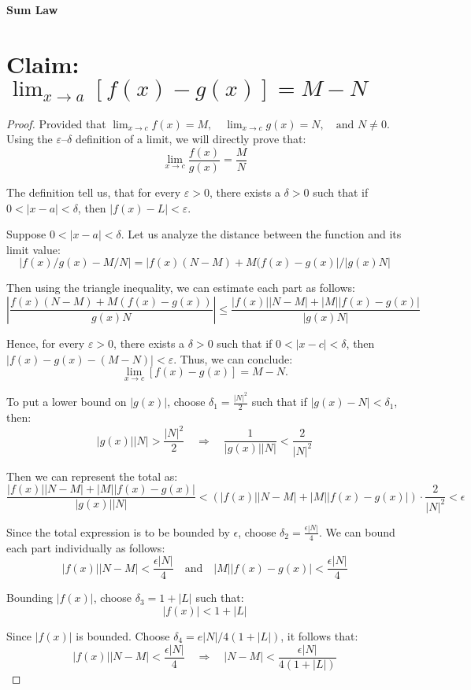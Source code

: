 \documentclass{article}
\begin{document}
\textbf{Sum Law}

\section*{Claim: $\lim_{x \to a} [f(x) - g(x)] = M - N$}


\begin{proof}

Provided that $\lim_{x \to c} f(x) = M, \quad \lim_{x \to c} g(x) = N, \quad \text{and } N \neq 0.$ Using the $\varepsilon$–$\delta$ definition of a limit, we will directly prove that:
\[
\lim_{x \to c} \frac{f(x)}{g(x)} = \frac{M}{N}
\]


The definition tell us, that for every $\varepsilon > 0$, there exists a $\delta > 0$ such that if $0 < |x - a| < \delta$, then $|f(x) - L| < \varepsilon$.

Suppose $0 < |x - a| < \delta$. Let us analyze the distance between the function and its limit value:
\[
|f(x)/g(x) - M/N| = |f(x)(N - M) + M(f(x) - g(x)| / |g(x)N|
\]

Then using the triangle inequality, we can estimate each part as follows:
\[
\left| \frac{f(x)(N - M) + M(f(x) - g(x))}{g(x)N} \right|
\leq \frac{|f(x)||N - M| + |M||f(x) - g(x)|}{|g(x)N|}
\]

Hence, for every $\varepsilon > 0$, there exists a $\delta > 0$ such that if $0 < |x - c| < \delta$, then $|f(x) - g(x) - (M - N)| < \varepsilon$. Thus, we can conclude:
\[
\lim_{x \to c} [f(x) - g(x)] = M - N.
\]

To put a lower bound on $|g(x)|$, choose $\delta_1 = \frac{|N|^2}{2}$ such that if $|g(x) - N| < \delta_1$, then:
\[
|g(x)||N| > \frac{|N|^2}{2}
\quad \Rightarrow \quad
\frac{1}{|g(x)||N|} < \frac{2}{|N|^2}
\]

Then we can represent the total as:
\[
\frac{|f(x)||N - M| + |M||f(x) - g(x)|}{|g(x)||N|}
< \left( |f(x)||N - M| + |M||f(x) - g(x)| \right) \cdot \frac{2}{|N|^2}
< \epsilon
\]

Since the total expression is to be bounded by $\epsilon$, choose $\delta_2 = \frac{\epsilon |N|}{4}$. We can bound each part individually as follows:
\[
|f(x)||N - M| < \frac{\epsilon |N|}{4}
\quad \text{and} \quad
|M||f(x) - g(x)| < \frac{\epsilon |N|}{4}
\]

Bounding $|f(x)|$, choose $\delta_3 = 1 + |L|$ such that:
\[
|f(x)| < 1 + |L|
\]

Since $|f(x)|$ is bounded. Choose $\delta_4 = e|N|/4(1 + |L|)$, it follows that:
\[
|f(x)||N - M| < \frac{\epsilon |N|}{4} 
\quad \Rightarrow \quad
|N - M| < \frac{\epsilon |N|}{4(1 + |L|)}
\]



\end{proof}
\end{document}
